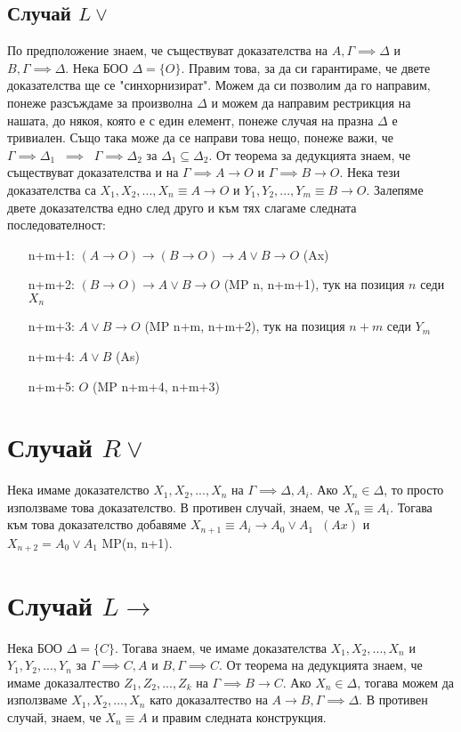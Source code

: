 \documentclass[12pt]{article}
\begin{document}
\subsection*{Случай $L \lor$}
По предположение знаем, че съществуват доказателства на $A, \Gamma \implies \Delta$ и $B, \Gamma \implies \Delta$. Нека БОО $\Delta = \{ O \}$. Правим това, за да си гарантираме, че двете доказателства ще се "синхорнизират". Можем да си позволим да го направим, понеже разсъждаме за произволна $\Delta$ и можем да направим рестрикция на нашата, до някоя, която е с един елемент, понеже случая на празна $\Delta$ е тривиален. Също така може да се направи това нещо, понеже важи, че $\Gamma \implies \Delta_1 \; \; \implies \; \; \Gamma \implies \Delta_2$ за $\Delta_1 \subseteq \Delta_2$. От теорема за дедукцията знаем, че съществуват доказателства и на $\Gamma \implies A \rightarrow O$ и $\Gamma \implies B \rightarrow O$. Нека тези доказателства са $X_1, X_2, ..., X_n \equiv A \rightarrow O$ и $Y_1, Y_2, ..., Y_m \equiv B \rightarrow O$. Залепяме двете доказателства едно след друго и към тях слагаме следната последователност:
\begin{itemize}[itemindent=4em]
    \item[n+m+1: ] $ (A \rightarrow O) \rightarrow (B \rightarrow O) \rightarrow A \lor B \rightarrow O $ (Ax)    
    \item[n+m+2: ] $(B \rightarrow O) \rightarrow A \lor B \rightarrow O$ (MP n, n+m+1), тук на позиция $n$ седи $X_n$ 
    \item[n+m+3: ] $A \lor B \rightarrow O$ (MP n+m, n+m+2), тук на позиция $n+m$ седи $Y_m$ 
    \item[n+m+4: ] $ A \lor B $ (As) 
    \item[n+m+5: ] $O$ (MP n+m+4, n+m+3)
\end{itemize}

\section*{Случай $R \lor$}
Нека имаме доказателство $X_1, X_2, ..., X_n$ на $\Gamma \implies \Delta, A_i$. Ако $X_n \in \Delta$, то просто използваме това доказателство. В противен случай, знаем, че $X_n \equiv A_i$. Тогава към това доказателство добавяме $X_{n+1} \equiv A_i \rightarrow A_0 \lor A_1 \; \; (Ax)$ и $X_{n+2} = A_0 \lor A_1$ MP(n, n+1). 

\section*{Случай $L \rightarrow$}
Нека БОО $\Delta = \{ C \}$. Тогава знаем, че имаме доказателства $X_1, X_2, ..., X_n$ и $Y_1, Y_2, ..., Y_n$ за $\Gamma \implies C, A$ и $B, \Gamma \implies C$. От теорема на дедукцията знаем, че имаме доказалтество $Z_1, Z_2, ..., Z_k$ на $\Gamma \implies B \rightarrow C$. Ако $X_n \in \Delta$, тогава можем да използваме $X_1, X_2, ..., X_n$ като доказалтество на $A \rightarrow B, \Gamma \implies \Delta$. В противен случай, знаем, че $X_n \equiv A$ и правим следната конструкция.  
\end{document}
